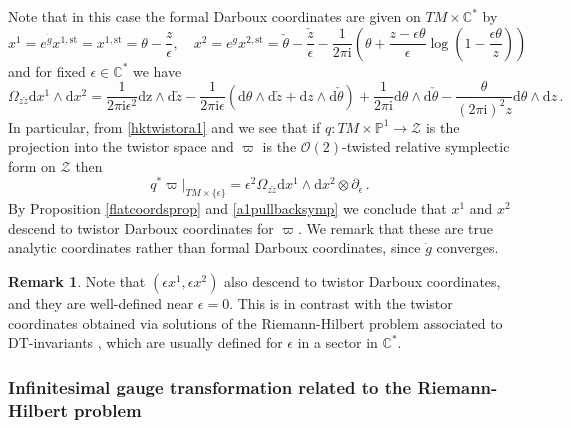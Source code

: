 \documentclass{article}
\theoremstyle{definition}
\newtheorem{remark}[theorem]{Remark}
\numberwithin{equation}{section}
\begin{document}
Note that in this case the formal Darboux coordinates are given on $TM\times \mathbb{C}^*$ by
\begin{equation*}
    x^1=e^{\dot{g}}x^{1,\text{st}}=x^{1,\text{st}}=\theta-\frac{z}{\epsilon}, \quad x^2=e^{\dot{g}}x^{2,\text{st}}=\check{\theta}-\frac{\check{z}}{\epsilon}-\frac{1}{2\pi \mathrm{i}}\left(\theta+\frac{z-\epsilon \theta}{\epsilon}\log\left(1-\frac{\epsilon \theta}{z}\right)\right)
\end{equation*}
and for fixed $\epsilon\in \mathbb{C}^{*}$ we have
\begin{equation}\label{hktwistora1}
    \Omega_{z\check{z}}\mathrm{d}x^1\wedge \mathrm{d}x^2= \frac{1}{2\pi \mathrm{i}\epsilon^2}\mathrm{dz}\wedge \mathrm{d}\check{z}-\frac{1}{2\pi \mathrm{i}\epsilon}\left(\mathrm{d}\theta \wedge \mathrm{d}\check{z}+\mathrm{d}z\wedge \mathrm{d}\check{\theta}\right)+\frac{1}{2\pi\mathrm{i}}\mathrm{d}\theta\wedge \mathrm{d}\check{\theta} -\frac{\theta}{(2\pi \mathrm{i})^2z}\mathrm{d}\theta \wedge \mathrm{d}z\,.
\end{equation}
In particular, from \eqref{hktwistora1} and \cite[Equation (24-26)]{TwistorJoyce} we see that if $q:TM\times \mathbb{P}^1\to \mathcal{Z}$ is the projection into the twistor space and $\varpi$ is the $\mathcal{O}(2)$-twisted relative symplectic form on $\mathcal{Z}$ then  
\begin{equation}\label{a1pullbacksymp}
    q^*\varpi|_{TM\times \{\epsilon\}} = \epsilon^2\Omega_{z\check{z}}\mathrm{d}x^1\wedge \mathrm{d}x^2 \otimes \partial_{\epsilon}\,.
\end{equation}
By Proposition \ref{flatcoordsprop} and \eqref{a1pullbacksymp} we conclude that $x^1$ and $x^2$ descend to twistor Darboux coordinates for $\varpi$. We remark that these are true analytic coordinates rather than formal Darboux coordinates, since $\dot{g}$ converges. 

\begin{remark}
Note that $(\epsilon x^1,\epsilon x^2)$ also descend to twistor Darboux coordinates, and they are well-defined near $\epsilon=0$. This is in contrast with the twistor coordinates obtained via solutions of the Riemann-Hilbert problem associated to DT-invariants \cite{varBPS}, which are usually defined for $\epsilon$ in a sector in $\mathbb{C}^*$.
\end{remark}

\subsubsection{Infinitesimal gauge transformation related to the Riemann-Hilbert problem}
\end{document}
